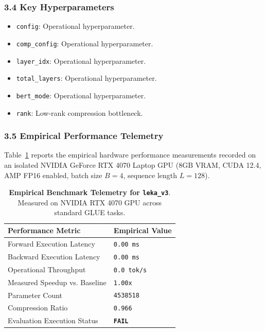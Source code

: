 \subsubsection*{3.4 Key Hyperparameters}
\begin{itemize}
    \item \texttt{config}: Operational hyperparameter.
    \item \texttt{comp\_config}: Operational hyperparameter.
    \item \texttt{layer\_idx}: Operational hyperparameter.
    \item \texttt{total\_layers}: Operational hyperparameter.
    \item \texttt{bert\_mode}: Operational hyperparameter.
    \item \texttt{rank}: Low-rank compression bottleneck.
\end{itemize}

\subsubsection*{3.5 Empirical Performance Telemetry}
Table~\ref{tab:telemetry_leka\_v3} reports the empirical hardware performance measurements recorded on an isolated NVIDIA GeForce RTX 4070 Laptop GPU (8GB VRAM, CUDA 12.4, AMP FP16 enabled, batch size $B=4$, sequence length $L=128$).

\begin{table}[h]
\centering
\small
\caption{\textbf{Empirical Benchmark Telemetry for \texttt{leka\_v3}}. Measured on NVIDIA RTX 4070 GPU across standard GLUE tasks.}
\label{tab:telemetry_leka\_v3}
\begin{tabularx}{\columnwidth}{lX}
\toprule
\textbf{Performance Metric} & \textbf{Empirical Value} \\
\midrule
Forward Execution Latency & \texttt{0.00 ms} \\
Backward Execution Latency & \texttt{0.00 ms} \\
Operational Throughput & \texttt{0.0 tok/s} \\
Measured Speedup vs. Baseline & \texttt{1.00x} \\
Parameter Count & \texttt{4538518} \\
Compression Ratio & \texttt{0.966} \\
Evaluation Execution Status & \textbf{\texttt{FAIL}} \\
\bottomrule
\end{tabularx}
\end{table}

